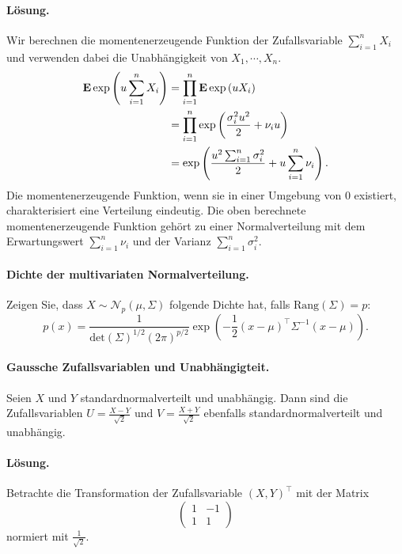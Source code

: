 \paragraph*{Lösung. }
Wir berechnen die momentenerzeugende Funktion der Zufallsvariable $\sum_{i=1}^{n} X_i$
und verwenden dabei die Unabhängigkeit von $X_1, \cdots, X_n$.
\begin{align*}
    \mathbf{E} \exp \left( u \sum_{i=1}^{n} X_i \right) 
    &= \prod_{i=1}^{n} \mathbf{E} \exp \left( u X_i \right) \\
    &= \prod_{i=1}^n \exp \left( \frac{\sigma_i^2 u^2 }{2} + \nu_i u \right) \\
    &= \exp \left( \frac{ u^2 \sum_{i=1}^{n} \sigma_i^2 }{2} + u \sum_{i=1}^{n} \nu_i \right).
\end{align*}
Die momentenerzeugende Funktion, wenn sie in einer Umgebung von $0$ existiert, 
charakterisiert eine Verteilung eindeutig. Die oben berechnete momentenerzeugende Funktion
gehört zu einer Normalverteilung mit dem Erwartungswert $\sum_{i=1}^{n} \nu_i$ und
der Varianz $\sum_{i=1}^{n} \sigma^2_i$. 


\paragraph{Dichte der multivariaten Normalverteilung. } Zeigen Sie, dass 
$X \sim \mathcal N_p\left( \mu, \Sigma \right) $ folgende Dichte hat, falls 
$\textrm{Rang}(\Sigma)=p$: 
\begin{equation*}
    p(x) = \frac{1}{ \textrm{det}(\Sigma)^{1/2} (2\pi)^{p/2}} \exp\left( - \frac{1}{2} (x  - \mu)^\top \Sigma^{-1} (x - \mu) \right).
\end{equation*} %


\paragraph{Gaussche Zufallsvariablen und Unabhängigteit. } Seien $X$ und $Y$
standardnormalverteilt und unabhängig. Dann sind die Zufallsvariablen $U =
\frac{X-Y}{\sqrt{2}}$ und $V=\frac{X+Y}{\sqrt{2}}$ ebenfalls standardnormalverteilt 
und unabhängig. 

\paragraph*{Lösung.} Betrachte die Transformation der Zufallsvariable $(X,Y)^\top$
mit der Matrix
\begin{equation*}
    \begin{pmatrix}
        1 & -1 \\ 1 & 1 
    \end{pmatrix}
\end{equation*}
normiert mit $\frac{1}{\sqrt{2}}$. 


